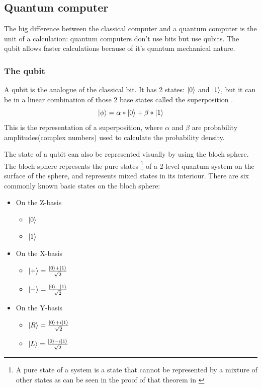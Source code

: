 \subsection{Quantum computer} \label{quantum computer}
The big difference between the classical computer and a quantum computer is the unit of a calculation: quantum computers don't use bits but use qubits.
The qubit allows faster calculations because of it's quantum mechanical nature.


\subsubsection{The qubit} \label{qubit}
A qubit is the analogue of the classical bit. It has 2 states: $\ket{0}$ and $\ket{1}$, but it can be in a linear combination of those 2 base states called the superposition \autocite{thequbit}.
\begin{equation}
    \ket{\phi} = \alpha * \ket{0} + \beta * \ket{1}
\end{equation}
This is the representation of a superposition, where $\alpha$ and $\beta$ are probability amplitudes(complex numbers) used to calculate the probability density.


The state of a qubit can also be represented visually by using the bloch sphere. The bloch sphere represents the pure states \footnote{A pure state of a system is a state that cannot be represented by a mixture of other states as can be seen in the proof of that theorem in \textcite{Ballentine2014}} of a 2-level quantum system on the surface of the sphere, and represents mixed states in its interiour.
There are six commonly known basic states on the bloch sphere:

\begin{itemize}
    \item On the Z-basis
        \begin{itemize}
            \item $\ket{0}$
            \item $\ket{1}$
        \end{itemize}
    \item On the X-basis
        \begin{itemize}
            \item $\ket{+} = \frac{\ket{0} + \ket{1}}{\sqrt{2}}$
            \item $\ket{-} = \frac{\ket{0} - \ket{1}}{\sqrt{2}}$
        \end{itemize}
    \item On the Y-basis
        \begin{itemize}
            \item $\ket{R} = \frac{\ket{0} + i \ket{1}}{\sqrt{2}}$
            \item $\ket{L} = \frac{\ket{0} - i \ket{1}}{\sqrt{2}}$
        \end{itemize}
\end{itemize}


